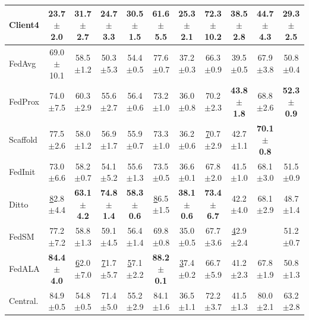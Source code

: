 \begin{table}[t]
{\begin{tabular}{l|cccccccc|cc}
Client4     & 23.7$\pm$2.0            & 31.7$\pm$2.7          & 24.7$\pm$3.3          & 30.5$\pm$1.5          & 61.6$\pm$5.5            & 25.3$\pm$2.1          & 72.3$\pm$10.2         & 38.5$\pm$2.8                  & \cellcolor[HTML]{E6EFE6}44.7$\pm$4.3          & \cellcolor[HTML]{E6EFE6}29.3$\pm$2.5          \\ \hline
FedAvg      & 69.0$\pm$10.1           & 58.5$\pm$1.2          & 50.3$\pm$5.3          & 54.4$\pm$0.5          & 77.6$\pm$0.7            & 37.2$\pm$0.3          & 66.3$\pm$0.9          & 39.5$\pm$0.5                  & \cellcolor[HTML]{E6EFE6}67.9$\pm$3.8          & \cellcolor[HTML]{E6EFE6}50.8$\pm$0.4          \\
FedProx     & 74.0$\pm$7.5            & 60.3$\pm$2.9          & 55.6$\pm$2.7          & 56.4$\pm$0.6          & 73.2$\pm$1.0            & 36.0$\pm$0.8          & 70.2$\pm$2.3          & \textbf{43.8$\pm$1.8}         & \cellcolor[HTML]{E6EFE6}68.8$\pm$2.6          & \cellcolor[HTML]{E6EFE6}\textbf{52.3$\pm$0.9} \\
Scaffold    & 77.5$\pm$2.6            & 58.0$\pm$1.2          & 56.9$\pm$1.7          & 55.9$\pm$0.7          & 73.3$\pm$1.0            & 36.2$\pm$0.6          & {\ul 70.7$\pm$2.9}    & 42.7$\pm$1.1                  & \cellcolor[HTML]{E6EFE6}\textbf{70.1$\pm$0.8} & \cellcolor[HTML]{E6EFE6}{\ul 52.1$\pm$0.7}    \\
FedInit     & 73.0$\pm$6.6          & 58.2$\pm$0.7        & 54.1$\pm$5.2        & 55.6$\pm$1.3        & 73.5$\pm$0.5          & 36.6$\pm$0.1        & 67.8$\pm$2.0        & 41.5$\pm$1.0                & \cellcolor[HTML]{E6EFE6}68.1$\pm$3.0        & \cellcolor[HTML]{E6EFE6}51.5$\pm$0.9        \\
Ditto       & {\ul 82.8$\pm$4.4}      & \textbf{63.1$\pm$4.2} & \textbf{74.8$\pm$1.4} & \textbf{58.3$\pm$0.6} & {\ul 86.5$\pm$1.5}      & \textbf{38.1$\pm$0.6} & \textbf{73.4$\pm$6.7} & 42.2$\pm$4.0                  & \cellcolor[HTML]{E6EFE6}68.1$\pm$2.9          & \cellcolor[HTML]{E6EFE6}48.7$\pm$1.4          \\
FedSM       & 77.2$\pm$7.2          & 58.8$\pm$1.3        & 59.1$\pm$4.5        & 56.4$\pm$1.4        & 69.8$\pm$0.8          & 35.0$\pm$0.5        & 67.7$\pm$3.6        & {\ul 42.9$\pm$2.4} & \cellcolor[HTML]{E6EFE6}{\ul 68.9$\pm$2.5}  & \cellcolor[HTML]{E6EFE6}51.2$\pm$0.7        \\
FedALA      & \textbf{84.4$\pm$4.0} & {\ul 62.0$\pm$7.0}  & {\ul 71.7$\pm$5.7}  & {\ul 57.1$\pm$2.2}  & \textbf{88.2$\pm$0.1} & {\ul 37.4$\pm$0.2}  & 66.7$\pm$5.9        & 41.2$\pm$2.3                & \cellcolor[HTML]{E6EFE6}67.8$\pm$1.9        & \cellcolor[HTML]{E6EFE6}50.8$\pm$1.3        \\ \hline
Central. & 84.9$\pm$0.5            & 54.8$\pm$0.5          & 71.4$\pm$5.0          & 55.2$\pm$2.9          & 84.1$\pm$1.6            & 36.5$\pm$1.1          & 72.2$\pm$3.7          & 41.5$\pm$1.3                  & \cellcolor[HTML]{E6EFE6}80.0$\pm$2.1          & \cellcolor[HTML]{E6EFE6}63.2$\pm$2.8          \\ \hline
\end{tabular}
}
\end{table}